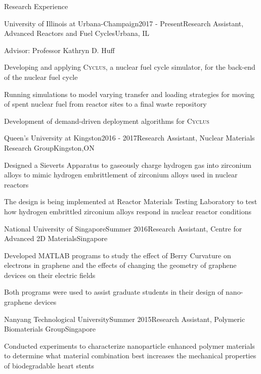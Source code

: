 \documentclass{resume2} %
\begin{document}
\begin{rSection}{Research Experience}

\begin{rSubsection}{University of Illinois at Urbana-Champaign}{2017 - Present}{Research Assistant, Advanced Reactors and Fuel Cycles}{Urbana, IL}
\item Advisor: Professor Kathryn D. Huff
\item Developing and applying \textsc{Cyclus}, a nuclear fuel cycle simulator, for the back-end of the nuclear fuel cycle
\item Running simulations to model varying transfer and loading strategies for moving of spent nuclear fuel from reactor sites to a final waste repository
\item Development of demand-driven deployment algorithms for \textsc{Cyclus} 
\end{rSubsection}

\begin{rSubsection}{Queen's University at Kingston}{2016 - 2017}{Research Assistant, Nuclear Materials Research Group}{Kingston,ON}
\item Designed a Sieverts Apparatus to gaseously charge hydrogen gas into zirconium alloys to mimic hydrogen embrittlement of zirconium alloys used in nuclear reactors
\item The design is being implemented at Reactor Materials Testing Laboratory to test how hydrogen embrittled zirconium alloys respond in nuclear reactor conditions
\iffalse
\item Application to nuclear industry: zirconium alloys used in nuclear reactors succumb to hydrogen embrittlement during its lifetime, therefore, it is important to be able to replicate the conditions in nuclear reactors, so as to study its end-of-life conditions
\fi
\end{rSubsection}

\begin{rSubsection}{National University of Singapore}{Summer 2016}{Research Assistant, Centre for Advanced 2D Materials}{Singapore}
	\item Developed MATLAB programs to study the effect of Berry Curvature on electrons in graphene and the effects of changing the geometry of graphene devices on their electric fields 
	\item Both programs were used to assist graduate students in their design of nano-graphene devices
\end{rSubsection}

	\begin{rSubsection}{Nanyang Technological University}{Summer 2015}{Research Assistant, Polymeric Biomaterials Group}{Singapore}
	\item Conducted experiments to characterize nanoparticle enhanced polymer materials to determine what material combination best increases the mechanical properties of biodegradable heart stents  
	\end{rSubsection}

\end{rSection}
\end{document}
